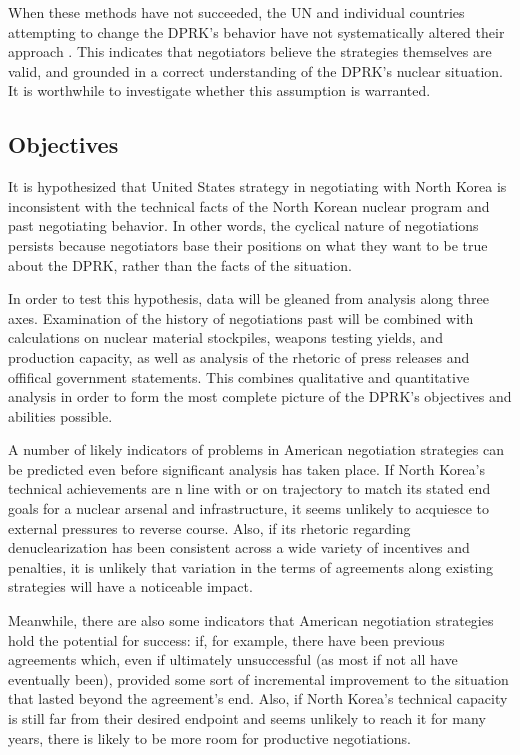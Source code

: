 \documentclass{article}
\begin{document}
When these methods have not succeeded, the UN and individual countries attempting to change the DPRK’s behavior have not systematically altered their approach \cite{davenport,nti15}. This indicates that negotiators believe the strategies themselves are valid, and grounded in a correct understanding of the DPRK’s nuclear situation. It is worthwhile to investigate whether this assumption is warranted.

\subsection{Objectives}

It is hypothesized that United States strategy in negotiating with North Korea is inconsistent with the technical facts of the North Korean nuclear program and past negotiating behavior. In other words, the cyclical nature of negotiations persists because negotiators base their positions on what they want to be true about the DPRK, rather than the facts of the situation. 

In order to test this hypothesis, data will be gleaned from analysis along three axes. Examination of the history of negotiations past will be combined with calculations on nuclear material stockpiles, weapons testing yields, and production capacity, as well as analysis of the rhetoric of press releases and offifical government statements. This combines qualitative and quantitative analysis in order to form the most complete picture of the DPRK's objectives and abilities possible.

A number of likely indicators of problems in American negotiation strategies can be predicted even before significant analysis has taken place. If North Korea's technical achievements are n line with or on trajectory to match its stated end goals for a nuclear arsenal and infrastructure, it seems unlikely to acquiesce to external pressures to reverse course. Also, if its rhetoric regarding denuclearization has been consistent across a wide variety of incentives and penalties, it is unlikely that variation in the terms of agreements along existing strategies will have a noticeable impact.

Meanwhile, there are also some indicators that American negotiation strategies hold the potential for success: if, for example, there have been previous agreements which, even if ultimately unsuccessful (as most if not all have eventually been), provided some sort of incremental improvement to the situation that lasted beyond the agreement's end. Also, if North Korea's technical capacity is still far from their desired endpoint and seems unlikely to reach it for many years, there is likely to be more room for productive negotiations.
\end{document}
